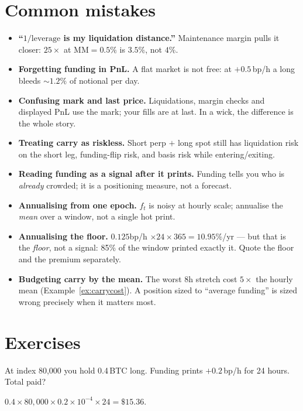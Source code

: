 \section{Common mistakes}
\begin{itemize}
\item \textbf{``$1/\text{leverage}$ is my liquidation distance.''} Maintenance margin pulls it
  closer: $25\times$ at $\mathrm{MM}=0.5\%$ is $3.5\%$, not $4\%$.
\item \textbf{Forgetting funding in PnL.} A flat market is not free: at $+0.5$\,bp/h a long
  bleeds $\sim1.2\%$ of notional per day.
\item \textbf{Confusing mark and last price.} Liquidations, margin checks and displayed PnL
  use the mark; your fills are at last. In a wick, the difference is the whole story.
\item \textbf{Treating carry as riskless.} Short perp $+$ long spot still has liquidation
  risk on the short leg, funding-flip risk, and basis risk while entering/exiting.
\item \textbf{Reading funding as a signal after it prints.} Funding tells you who is
  \emph{already} crowded; it is a positioning measure, not a forecast.
\item \textbf{Annualising from one epoch.} $f_t$ is noisy at hourly scale; annualise the
  \emph{mean} over a window, not a single hot print.
\item \textbf{Annualising the floor.} $0.125$bp/h $\times
24\times365 = 10.95\%$/yr --- but that is the \emph{floor}, not a
signal: 85\% of the window printed exactly it. Quote the floor and
the premium separately.
\item \textbf{Budgeting carry by the mean.} The worst 8h stretch
cost $5\times$ the hourly mean (Example~\ref{ex:carrycost}). A
position sized to ``average funding'' is sized wrong precisely
when it matters most.
\end{itemize}

\section{Exercises}
\begin{exercise}[easy]
At index 80{,}000 you hold 0.4\,BTC long. Funding prints $+0.2$\,bp/h for 24 hours. Total paid?
\end{exercise}
\begin{solution}
$0.4\times80{,}000\times0.2\times10^{-4}\times24=\$15.36$.
\end{solution}

